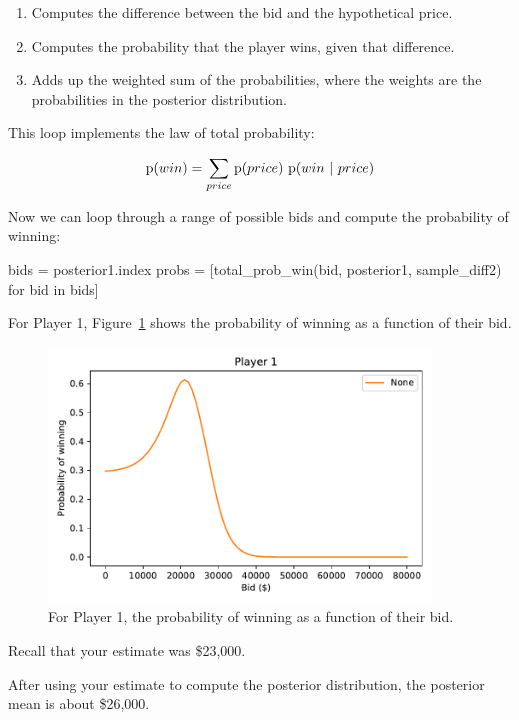 \documentclass[12pt]{book}
\theoremstyle{exercise}
\begin{document}
\begin{enumerate}

\item Computes the difference between the bid and the hypothetical price.

\item Computes the probability that the player wins, given that difference.

\item Adds up the weighted sum of the probabilities, where the weights are the probabilities in the posterior distribution.

\end{enumerate}

This loop implements the law of total probability:

\[ \mathrm{p}(win) = \sum_{price} \mathrm{p}(price) ~ \mathrm{p}(win ~|~ price) \]

Now we can loop through a range of possible bids and compute the probability of winning:

\begin{code}
bids = posterior1.index
probs = [total_prob_win(bid, posterior1, sample_diff2)
         for bid in bids]
\end{code}

For Player 1, Figure~\ref{fig08-05} shows the probability of winning as a function of their bid.

\begin{figure}
\centerline{\includegraphics[width=4in]{figs/fig08-05.pdf}}
\caption{For Player 1, the probability of winning as a function of their bid.}
\label{fig08-05}
\end{figure}

Recall that your estimate was \$23,000.

After using your estimate to compute the posterior distribution, the posterior mean is about \$26,000.
\end{document}
